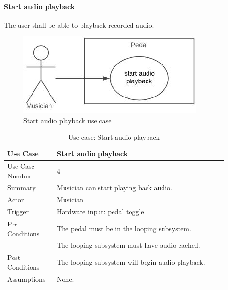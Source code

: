       
        \paragraph{Start audio playback} 
            The user shall be able to playback recorded audio.
            \begin{figure}[!ht]
                \centering
                \includegraphics[width=.5\textwidth]{diagrams/use_cases/uc-play-start.JPG}
                \caption{Start audio playback use case}
                \label{fig:uc-play-start}
            \end{figure}
            \clearpage
            \begin{table}[!ht]
                \centering
                \begin{tabular}{| p{0.2\linewidth} | p{0.7\linewidth} |}
                    \hline
                    Use Case & Start audio playback \\ 
                    \hline \hline 
                    Use Case Number & 4 \\ \hline
                    Summary & Musician can start playing back audio. \\ \hline
                    Actor & Musician \\ \hline
                    Trigger & Hardware input: pedal toggle \\ \hline
                    Pre-Conditions & The pedal must be in the looping subsystem. \\
                    & The looping subsystem must have audio cached. \\ \hline
                    Post-Conditions & The looping subsystem will begin audio playback. \\ \hline
                    Assumptions & None. \\ \hline
                \end{tabular}
                \\
                \caption{Use case: Start audio playback}
                \label{tab:uc-play-start}
            \end{table}
            
